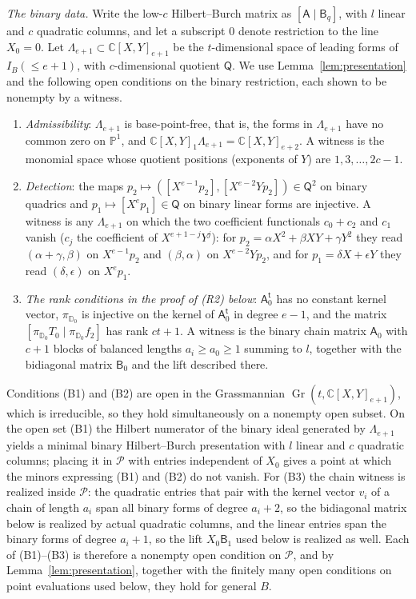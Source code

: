 \documentclass{amsart}
\theoremstyle{definition}
\theoremstyle{remark}
\numberwithin{equation}{section}
\newcommand{\CC}{\mathbb{C}}
\newcommand{\PP}{\mathbb{P}}
\DeclareMathOperator{\Gr}{Gr}
\begin{document}
\emph{The binary data.} Write the low-$c$ Hilbert--Burch matrix as $[\mathsf A\mid
\mathsf B_q]$, with $l$ linear and $c$ quadratic columns, and let a subscript $0$ denote
restriction to the line $X_0=0$. Let $\Lambda_{e+1}\subset\CC[X,Y]_{e+1}$ be the
$t$-dimensional space of leading forms of $I_B(\le e+1)$, with $c$-dimensional quotient
$\mathsf Q$. We use Lemma~\ref{lem:presentation} and the following open conditions on the binary
restriction, each shown to be nonempty by a witness.
\begin{enumerate}[label=(B\arabic*)]
\item \emph{Admissibility}: $\Lambda_{e+1}$ is base-point-free, that is, the forms in
$\Lambda_{e+1}$ have no common zero on $\PP^1$, and
$\CC[X,Y]_1\Lambda_{e+1}=\CC[X,Y]_{e+2}$. A witness is the monomial space whose quotient
positions (exponents of $Y$) are $1,3,\dots,2c-1$.
\item \emph{Detection}: the maps $p_2\mapsto([X^{e-1}p_2],[X^{e-2}Yp_2])\in\mathsf Q^2$
on binary quadrics and $p_1\mapsto[X^ep_1]\in\mathsf Q$ on binary linear forms are
injective. A witness is any $\Lambda_{e+1}$ on which the two coefficient functionals
$c_0+c_2$ and $c_1$ vanish ($c_j$ the coefficient of $X^{e+1-j}Y^j$): for
$p_2=\alpha X^2+\beta XY+\gamma Y^2$ they read $(\alpha+\gamma,\beta)$ on $X^{e-1}p_2$ and
$(\beta,\alpha)$ on $X^{e-2}Yp_2$, and for $p_1=\delta X+\epsilon Y$ they read
$(\delta,\epsilon)$ on $X^ep_1$.
\item \emph{The rank conditions in the proof of (R2) below}: $\mathsf A_0^{\mathsf t}$ has
no constant kernel vector, $\pi_{\mathbb D_0}$ is injective on the kernel of
$\mathsf A_0^{\mathsf t}$ in degree $e-1$, and the matrix $[\pi_{\mathbb D_0}T_0\mid
\pi_{\mathbb D_0}f_2]$ has rank $ct+1$. A witness is the binary chain matrix
$\mathsf A_0$ with $c+1$ blocks of balanced lengths $a_i\ge a_0\ge1$ summing to $l$,
together with the bidiagonal matrix $\mathsf B_0$ and the lift described there.
\end{enumerate}
Conditions (B1) and (B2) are open in the Grassmannian $\Gr(t,\CC[X,Y]_{e+1})$, which is
irreducible, so they hold simultaneously on a nonempty open subset. On the open set (B1)
the Hilbert numerator of the binary ideal generated by $\Lambda_{e+1}$ yields a minimal
binary Hilbert--Burch presentation with $l$ linear and $c$ quadratic columns; placing it in
$\mathcal P$ with entries independent of $X_0$ gives a point at which the minors expressing
(B1) and (B2) do not vanish. For (B3) the chain witness is realized inside $\mathcal P$: the
quadratic entries that pair with the kernel vector $v_i$ of a chain of length $a_i$ span all
binary forms of degree $a_i+2$, so the bidiagonal matrix below is realized by actual
quadratic columns, and the linear entries span the binary forms of degree $a_i+1$, so the
lift $X_0\mathsf B_1$ used below is realized as well. Each of (B1)--(B3) is therefore a
nonempty open condition on $\mathcal P$, and by Lemma~\ref{lem:presentation}, together with
the finitely many open conditions on point evaluations used below, they hold for general
$B$.
\end{document}
